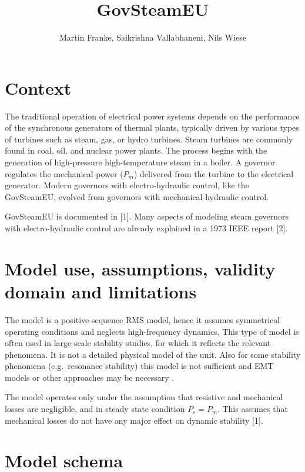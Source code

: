 \documentclass[
  a4paper,
  DIV=11,
  numbers=noendperiod]{scrartcl}
\title{GovSteamEU}
\author{Martin Franke, Saikrishna Vallabhaneni, Nils Wiese}
\date{}
\renewcommand*\contentsname{Table of contents}
\newcommand\contentsname{Table of contents}
\begin{document}
\maketitle

\renewcommand*\contentsname{Table of contents}
{
\hypersetup{linkcolor=}
\setcounter{tocdepth}{3}
\tableofcontents
}
\listoffigures
\listoftables

\section{Context}\label{context}

The traditional operation of electrical power systems depends on the
performance of the synchronous generators of thermal plants, typically
driven by various types of turbines such as steam, gas, or hydro
turbines. Steam turbines are commonly found in coal, oil, and nuclear
power plants. The process begins with the generation of high-pressure
high-temperature steam in a boiler. A governor regulates the mechanical
power (\(P_m\)) delivered from the turbine to the electrical generator.
Modern governors with electro-hydraulic control, like the GovSteamEU,
evolved from governors with mechanical-hydraulic control.

GovSteamEU is documented in {[}1{]}. Many aspects of modeling steam
governors with electro-hydraulic control are already explained in a 1973
IEEE report {[}2{]}.

\section{Model use, assumptions, validity domain and
limitations}\label{model-use-assumptions-validity-domain-and-limitations}

The model is a positive-sequence RMS model, hence it assumes symmetrical
operating conditions and neglects high-frequency dynamics. This type of
model is often used in large-scale stability studies, for which it
reflects the relevant phenomena. It is not a detailed physical model of
the unit. Also for some stability phenomena (e.g.~resonance stability)
this model is not sufficient and EMT models or other approaches may be
necessary .

The model operates only under the assumption that resistive and
mechanical losses are negligible, and in steady state condition
\(P_\mathrm{e} = P_\mathrm{m}\). This assumes that mechanical losses do
not have any major effect on dynamic stability {[}1{]}.

\section{Model schema}\label{model-schema}
\end{document}
